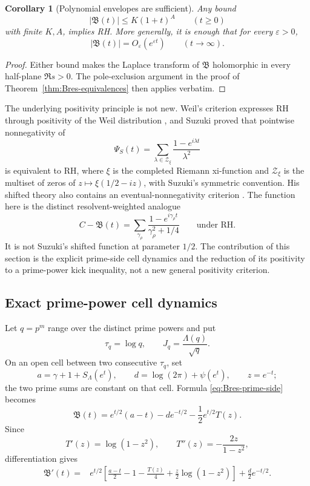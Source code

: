 \documentclass[11pt,a4paper]{article}
\numberwithin{equation}{section}
\newtheorem{corollary}[theorem]{Corollary}
\theoremstyle{definition}
\newcommand{\Bres}{\mathfrak B}
\begin{document}
\begin{corollary}[Polynomial envelopes are sufficient]
\label{cor:Bres-polynomial}
Any bound
\[
  |\Bres(t)|\le K(1+t)^A
  \qquad(t\ge0)
\]
with finite \(K,A\), implies RH.  More generally, it is enough that for every
\(\varepsilon>0\),
\[
  |\Bres(t)|=O_\varepsilon(e^{\varepsilon t})
  \qquad(t\to\infty).
\]
\end{corollary}

\begin{proof}
Either bound makes the Laplace transform of \(\Bres\) holomorphic in every
half-plane \(\Re s>0\).  The pole-exclusion argument in the proof of
Theorem~\ref{thm:Bres-equivalences} then applies verbatim.
\end{proof}

The underlying positivity principle is not new.  Weil's criterion expresses
RH through positivity of the Weil distribution \cite{weil1952}, and Suzuki
proved that pointwise nonnegativity of
\[
  \Psi_S(t)=\sum_{\lambda\in\mathcal Z_\xi}
  \frac{1-e^{i\lambda t}}{\lambda^2}
\]
is equivalent to RH, where \(\xi\) is the completed Riemann xi-function and
\(\mathcal Z_\xi\) is the multiset of zeros of
\(z\mapsto\xi(1/2-iz)\), with Suzuki's symmetric convention.  His shifted
theory also contains an
eventual-nonnegativity criterion \cite{Suzuki2023}.  The function here is the
distinct resolvent-weighted analogue
\[
  C-\Bres(t)=\sum_{\gamma_\rho}
  \frac{1-e^{i\gamma_\rho t}}{\gamma_\rho^2+1/4}
  \qquad\text{under RH}.
\]
It is not Suzuki's shifted function at parameter \(1/2\).  The contribution of
this section is the explicit prime-side cell dynamics and the reduction of its
positivity to a prime-power kick inequality, not a new general positivity
criterion.

\subsection{Exact prime-power cell dynamics}

Let \(q=p^m\) range over the distinct prime powers and put
\[
  \tau_q=\log q,
  \qquad
  J_q=\frac{\Lambda(q)}{\sqrt q}.
\]
On an open cell between two consecutive \(\tau_q\), set
\[
  a=\gamma+1+S_\Lambda(e^t),
  \qquad
  d=\log(2\pi)+\psi(e^t),
  \qquad z=e^{-t};
\]
the two prime sums are constant on that cell.  Formula
\eqref{eq:Bres-prime-side} becomes
\begin{equation}\label{eq:Bres-cell-formula}
  \Bres(t)=e^{t/2}(a-t)-de^{-t/2}
  -\frac12e^{t/2}T(z).
\end{equation}
Since
\[
  T'(z)=\log(1-z^2),
  \qquad
  T''(z)=-\frac{2z}{1-z^2},
\]
differentiation gives
\begin{align}
  \Bres'(t)={}&e^{t/2}\left[
  \frac{a-t}{2}-1-\frac{T(z)}4
  +\frac z2\log(1-z^2)
  \right]+\frac d2e^{-t/2}.
  \label{eq:Bres-cell-derivative}
\end{align}
\end{document}
